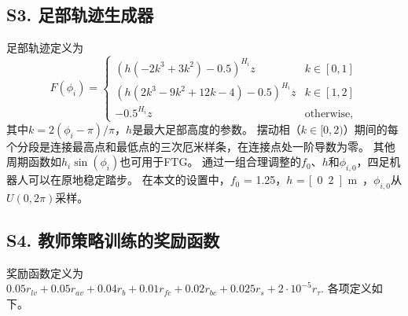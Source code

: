 \documentclass[9pt,twocolumn,twoside]{osajnl}
\begin{document}
\subsection*{S3. 足部轨迹生成器}

足部轨迹定义为
\begin{equation}
F(\phi_i) =
\begin{cases}
(h (-2k^3+3k^2) - 0.5) ^{H_i}z  &  k \in [0, 1] \\
(h (2k^3-9k^2+12k-4) - 0.5)  ^{H_i}z &  k \in [1, 2] \\
- 0.5 ^{H_i}z & \text{otherwise},
\end{cases}{}
\end{equation}
其中$k = 2 (\phi_i - \pi) / \pi$，$h$是最大足部高度的参数。
摆动相（$k \in [0, 2)$）期间的每个分段是连接最高点和最低点的三次厄米样条，在连接点处一阶导数为零。
其他周期函数如$ h_i \sin(\phi_i)$也可用于FTG。
通过一组合理调整的$f_0$、$h$和$\phi_{i,0}$，四足机器人可以在原地稳定踏步。
在本文的设置中，$f_0$ = 1.25，$h$ = \unit[0.2]{m}，$\phi_{i,0}$从$U(0, 2\pi)$采样。


\subsection*{S4. 教师策略训练的奖励函数}

奖励函数定义为
$0.05r_{lv} + 0.05r_{av} + 0.04r_b + 0.01r_{fc} + 0.02r_{bc} + 0.025 r_s+ 2 \cdot 10^{-5} r_{\tau}.$
各项定义如下。
\end{document}
